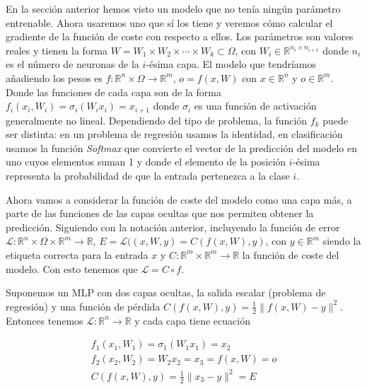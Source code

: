 En la sección anterior hemos visto un modelo que no tenía ningún parámetro entrenable. Ahora usaremos uno que sí los tiene y veremos cómo calcular el gradiente de la función de coste con respecto a ellos. Los parámetros son valores reales y tienen la forma $W= W_1 \times W_2 \times \cdots \times W_k \subset \Omega$, con $W_i \in \mathbb{R}^{n_i \times n_{i+1}}$ donde $n_i$ es el número de neuronas de la $i$-ésima capa. El modelo que tendríamos añadiendo los pesos es $f: \mathbb{R}^n \times \Omega \rightarrow \mathbb{R}^m$, $o=f(x,W)$ con $x \in \mathbb{R}^n$  y $o \in \mathbb{R}^m$. Donde las funciones de cada capa son de la forma $f_i(x_i, W_i)= \sigma_i(W_ix_i)=x_{i+1}$ donde $\sigma_i$ es una función de activación generalmente no lineal. Dependiendo del tipo de problema, la función $f_k$ puede ser distinta: en un problema de regresión usamos la identidad, en clasificación usamos la función \textit{Softmax} que convierte el vector de la predicción del modelo en uno cuyos elementos suman 1 y donde el elemento de la posición $i$-ésima representa la probabilidad de que la entrada pertenezca a la clase $i$.


Ahora vamos a considerar la función de coste del modelo como una capa más, a parte de las funciones de las capas ocultas que nos permiten obtener la predicción. Siguiendo con la notación anterior, incluyendo la función de error $\mathcal{L}: \mathbb{R}^n \times \Omega \times \mathbb{R}^m \rightarrow \mathbb{R}$, $E=\mathcal{L}((x,W,y)= C(f(x,W),y)$, con $y \in \mathbb{R}^m$ siendo la etiqueta correcta para la entrada $x$ y $C: \mathbb{R}^m \times \mathbb{R}^m \rightarrow \mathbb{R}$ la función de coste del modelo. Con esto tenemos que $\mathcal{L} = C \circ f$. 


\begin{ejemplo}
    Suponemos un MLP con dos capas ocultas, la salida escalar (problema de regresión) y una función de pérdida $C(f(x,W),y)=\frac{1}{2} \| f(x,W) - y\|^2$. Entonces tenemos $\mathcal{L}:\mathbb{R}^n \rightarrow \mathbb{R}$ y cada capa tiene ecuación

    
    
    \begin{gather*}
    f_1(x_1, W_1)=\sigma_1(W_1x_1)=x_2 \\
      f_2(x_2, W_2)=W_2x_2=x_3=f(x,W)=o  \\
      C(f(x,W),y)= \frac{1}{2} \| x_3 - y \|^2 = E
    \end{gather*}

    


\end{ejemplo}

